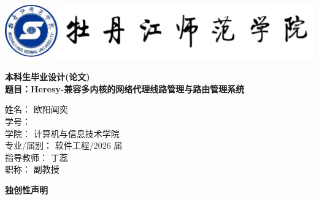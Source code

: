 \documentclass[12pt,a4paper]{article}%
\begin{document}
\pagestyle{fancy}%
\fancyhf{} %
\thispagestyle{empty}%
\begin{center}
	\includegraphics[width=15cm]{img/logo.png} %
	\vspace{0.5cm}

	\Huge \textbf{本科生毕业设计(论文)}\\[2cm]

	\LARGE \textbf{题目：Heresy-兼容多内核的网络代理线路管理与路由管理系统}\\[3cm]
\end{center}

\begin{flushleft}
	\large
	\begin{tabbing}
		姓\hspace{1.5em}名：\hspace{1.5em} \= 欧阳闻奕  \\[0.5cm]
		学\hspace{1.5em}号： \\[0.5cm]
		学\hspace{1.5em}院：\> 计算机与信息技术学院 \\[0.5cm]
		专业/届别：\> 软件工程/2026 届 \\[0.5cm]
		指导教师：\> 丁蕊 \\[0.5cm]
		职\hspace{1.5em}称：\> 副教授 \\[0.5cm]
	\end{tabbing}
\end{flushleft}

\newpage

\thispagestyle{empty}%
\begin{center}
    \large \textbf{独创性声明}
\end{center}
\end{document}
